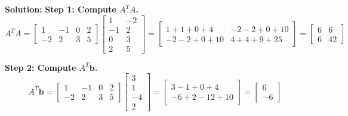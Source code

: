 \documentclass[11pt, letterpaper]{article}
\theoremstyle{definition}
\theoremstyle{remark}
\begin{document}
\textbf{Solution:}
\textbf{Step 1: Compute $A^T A$.}
\[
A^T A = \begin{bmatrix} 1 & -1 & 0 & 2 \\ -2 & 2 & 3 & 5 \end{bmatrix} \begin{bmatrix} 1 & -2 \\ -1 & 2 \\ 0 & 3 \\ 2 & 5 \end{bmatrix} = \begin{bmatrix} 1+1+0+4 & -2-2+0+10 \\ -2-2+0+10 & 4+4+9+25 \end{bmatrix} = \begin{bmatrix} 6 & 6 \\ 6 & 42 \end{bmatrix}
\]

\textbf{Step 2: Compute $A^T \mathbf{b}$.}
\[
A^T \mathbf{b} = \begin{bmatrix} 1 & -1 & 0 & 2 \\ -2 & 2 & 3 & 5 \end{bmatrix} \begin{bmatrix} 3 \\ 1 \\ -4 \\ 2 \end{bmatrix} = \begin{bmatrix} 3 - 1 + 0 + 4 \\ -6 + 2 - 12 + 10 \end{bmatrix} = \begin{bmatrix} 6 \\ -6 \end{bmatrix}
\]
\end{document}
